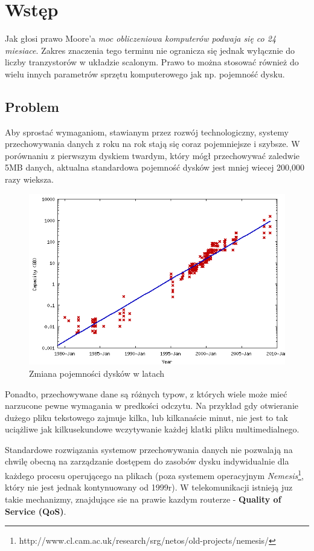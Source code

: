 \chapter{Wstęp} \label{ch:introduction}

Jak głosi prawo Moore'a \emph{moc obliczeniowa komputerów podwaja
się co 24 miesiace}. Zakres znaczenia tego terminu nie ogranicza się jednak
wyłącznie do liczby tranzystorów w układzie scalonym. Prawo to można stosować również
do wielu innych parametrów sprzętu komputerowego jak np. pojemność dysku.

\section{Problem}

Aby sprostać wymaganiom, stawianym przez rozwój technologiczny, systemy przechowywania
danych z roku na rok stają się coraz pojemniejsze i szybsze. W porównaniu z pierwszym dyskiem twardym, który mógł przechowywać zaledwie 5MB danych, aktualna standardowa pojemność dysków jest
mniej wiecej 200,000 razy wieksza.

\begin{figure}[h!]
	\centering
	\includegraphics[scale=0.5]{HDDOverTime.png}
		\caption{Zmiana pojemności dysków w latach}
\end{figure}

Ponadto, przechowywane dane są różnych typow, z których wiele może mieć narzucone pewne wymagania
w predkości odczytu. Na przykład gdy otwieranie dużego pliku tekstowego zajmuje kilka, lub
kilkanaście minut, nie jest to tak uciążliwe jak kilkusekundowe wczytywanie każdej klatki
pliku multimedialnego.

Standardowe rozwiązania systemow przechowywania danych nie pozwalają na chwilę obecną
na zarządzanie dostępem do zasobów dysku indywidualnie dla każdego procesu operującego na plikach
(poza systemem operacyjnym \emph{Nemesis}\footnote{http://www.cl.cam.ac.uk/research/srg/netos/old-projects/nemesis/}, który nie jest jednak kontynuowany od 1999r).
W telekomunikacji istnieją juz takie mechanizmy, znajdujące sie na prawie kazdym routerze - 
\textbf{Quality of Service (QoS)}.

